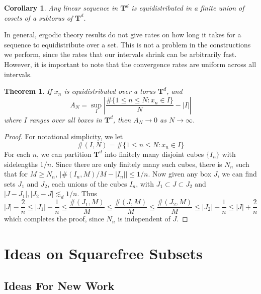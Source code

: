 \documentclass{report}
\theoremstyle{plain}
\newtheorem*{corollary}{Corollary}
\theoremstyle{plain}
\newtheorem{theorem}{Theorem}
\begin{document}
\begin{corollary}
    Any linear sequence in $\mathbf{T}^d$ is equidistributed in a finite union of cosets of a subtorus of $\mathbf{T}^d$.
\end{corollary}

In general, ergodic theory results do not give rates on how long it takes for a sequence to equidistribute over a set. This is not a problem in the constructions we perform, since the rates that our intervals shrink can be arbitrarily fast. However, it is important to note that the convergence rates are uniform across all intervals.

\begin{theorem}
    If $x_n$ is equidistributed over a torus $\mathbf{T}^d$, and
    \[ A_N = \sup_I \left| \frac{\# \{ 1 \leq n \leq N : x_n \in I \}}{N} - |I| \right| \]
    where $I$ ranges over all boxes in $\mathbf{T}^d$, then $A_N \to 0$ as $N \to \infty$.
\end{theorem}
\begin{proof}
    For notational simplicity, we let
    \[ \# (I,N) = \# \{ 1 \leq n \leq N: x_n \in I \} \]
    For each $n$, we can partition $\mathbf{T}^d$ into finitely many disjoint cubes $\{ I_n \}$ with sidelengths $1/n$. Since there are only finitely many such cubes, there is $N_n$ such that for $M \geq N_n$, $| \#(I_n,M)/M - |I_n|| \leq 1/n$. Now given any box $J$, we can find sets $J_1$ and $J_2$, each unions of the cubes $I_n$, with $J_1 \subset J \subset J_2$ and $|J - J_1|, |J_2 - J| \lesssim_d 1/n$. Thus
    \[ |J| - \frac{2}{n} \leq |J_1| - \frac{1}{n} \leq \frac{\#(J_1,M)}{M} \leq \frac{\#(J,M)}{M} \leq \frac{\#(J_2,M)}{M} \leq |J_2| + \frac{1}{n} \leq |J| + \frac{2}{n} \]
    which completes the proof, since $N_n$ is independent of $J$.
\end{proof}







\chapter{Ideas on Squarefree Subsets}

\section{Ideas For New Work}
\end{document}
